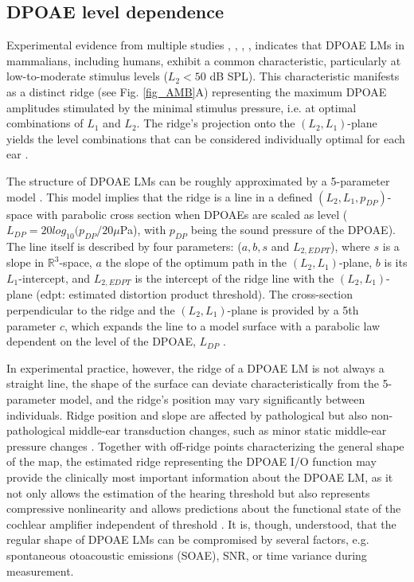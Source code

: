 \documentclass[journal,twoside,web]{ieeecolor2}
\begin{document}
\subsection{DPOAE level dependence}
\label{sec1_model}
Experimental evidence from multiple studies \cite{Wh1995}, \cite{Km2000}, \cite{ZD2015a}, \cite{ZD2020}, \cite{Cr1997} indicates that DPOAE LMs in mammalians, including humans, exhibit a common characteristic, particularly at low-to-moderate stimulus levels ($L_2<50$ dB SPL).
This characteristic manifests as a distinct ridge (see Fig. \ref{fig_AMB}A) representing the maximum DPOAE amplitudes stimulated by the minimal stimulus pressure, i.e. at optimal combinations of $L_1$ and $L_2$.
The ridge’s projection onto the $(L_2, L_1)$-plane yields the level combinations that can be considered individually optimal for each ear \cite{ZD2020}.
 
The structure of DPOAE LMs can be roughly approximated by a 5-parameter model \cite{ED2017}.
This model implies that the ridge is a line in a defined $(L_2, L_1, p_{DP})$-space with parabolic cross section when DPOAEs are scaled as level ($L_{DP}=20 log_{10} (p_{DP}/20 \mu$Pa), with $p_{DP}$ being the sound pressure of the DPOAE).
The line itself is described by four parameters: ($a, b, s$ and $L_{2,EDPT}$), where $s$ is a slope in $\mathbb{R}^3$-space, $a$ the slope of the optimum path in the $(L_2, L_1)$-plane, $b$ is its $L_1$-intercept, and $L_{2,EDPT}$ is the intercept of the ridge line with the $(L_2, L_1)$-plane (edpt: estimated distortion product threshold).
The cross-section perpendicular to the ridge and the $(L_2, L_1)$-plane is provided by a 5th parameter $c$, which expands the line to a model surface with a parabolic law dependent on the level of the DPOAE, $L_{DP}$ \cite{ZD2020}.

In experimental practice, however, the ridge of a DPOAE LM is not always a straight line, the shape of the surface can deviate characteristically from the 5-parameter model, and the ridge’s position may vary significantly between individuals.
Ridge position and slope are affected by pathological but also non-pathological middle-ear transduction changes, such as minor static middle-ear pressure changes \cite{Js2005}.
Together with off-ridge points characterizing the general shape of the map, the estimated ridge representing the DPOAE I/O function may provide the clinically most important information about the DPOAE LM, as it not only allows the estimation of the hearing threshold but also represents compressive nonlinearity and allows predictions about the functional state of the cochlear amplifier independent of threshold \cite{Ab2021}.
It is, though, understood, that the regular shape of DPOAE LMs can be compromised by several factors, e.g. spontaneous otoacoustic emissions (SOAE), SNR, or time variance during measurement.
\end{document}
